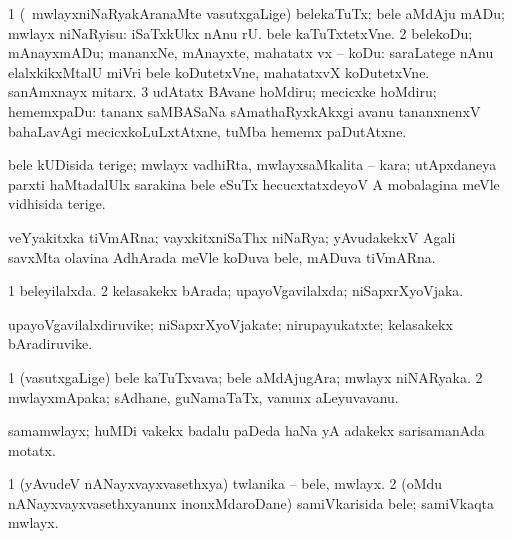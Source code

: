 \bentry 
{} 
\gl{\sakirx}
\bmng
\bnum
\num{1} (\kanmu\ mwlayxniNaRyakAranaMte vasutxgaLige) belekaTuTx; bele aMdAju mADu; mwlayx niNaRyisu:   iSaTxkUkx nAnu  rU. bele kaTuTxtetxVne. 
\num{2} belekoDu; mAnayxmADu; mananxNe, mAnayxte, mahatatx vx -- koDu:  saraLatege nAnu elalxkikxMtalU miVri bele koDutetxVne, mahatatxvX koDutetxVne.  sanAmxnayx mitarx. 
\num{3} udAtatx BAvane hoMdiru; mecicxke hoMdiru; hememxpaDu:  tananx saMBASaNa sAmathaRyxkAkxgi avanu tananxnenxV bahaLavAgi mecicxkoLuLxtAtxne, tuMba hememx paDutAtxne. 
\enum
\emng
\eentry

\bentry
{}
\gl{\nA}
\expl{}
\bmng
 bele kUDisida terige; mwlayx vadhiRta, mwlayxsaMkalita -- kara; utApxdaneya parxti haMtadalUlx sarakina bele eSuTx hecucxtatxdeyoV A mobalagina meVle vidhisida terige. 
\emng
\eentry

\bentry
{}
\gl{\nA}
\expl{}
\bmng
 veYyakitxka tiVmARna; vayxkitxniSaThx niNaRya; yAvudakekxV Agali savxMta olavina AdhArada meVle koDuva bele, mADuva tiVmARna. 
\emng
\eentry

\bentry
{} 
\gl{\gu}
\expl{}
\bmng
\bnum
\num{1} beleyilalxda. 
\num{2} kelasakekx bArada; upayoVgavilalxda; niSapxrXyoVjaka. 
\enum
\emng
\eentry

\bentry
{} 
\gl{\nA}
\expl{}
\bmng
 upayoVgavilalxdiruvike; niSapxrXyoVjakate; nirupayukatxte; kelasakekx bAradiruvike. 
\emng
\eentry

\bentry
{} 
\gl{\nA}
\expl{}
\bmng
\bnum
\num{1} (vasutxgaLige) bele kaTuTxvava; bele aMdAjugAra; mwlayx niNARyaka. 
\num{2} mwlayxmApaka; sAdhane, guNamaTaTx, \mo vanunx aLeyuvavanu. 
\enum
\emng
\eentry

\bentry
{}
\gl{\nA}
\expl{}
\bmng
 samamwlayx; huMDi \mo vakekx badalu paDeda haNa yA adakekx sarisamanAda motatx. 
\emng
\eentry

\bentry
{} 
\gl{\nA}
\expl{}
\bmng
\bnum
\num{1} (yAvudeV nANayxvayxvasethxya) twlanika -- bele, mwlayx. 
\num{2} (oMdu nANayxvayxvasethxyanunx inonxMdaroDane) samiVkarisida bele; samiVkaqta mwlayx. 
\enum
\emng
\eentry

